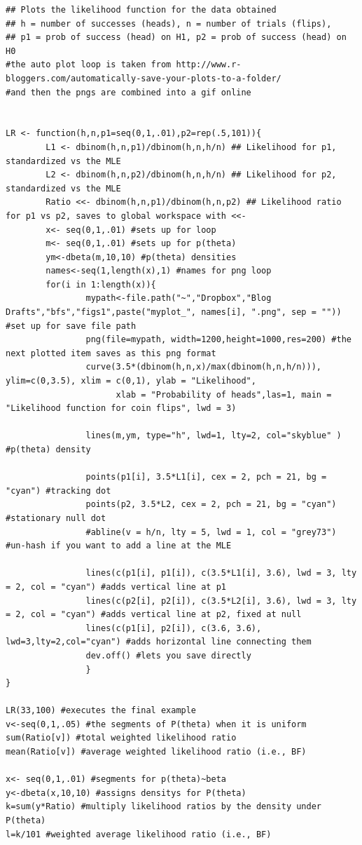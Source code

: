 \begin{lstlisting}
## Plots the likelihood function for the data obtained
## h = number of successes (heads), n = number of trials (flips), 
## p1 = prob of success (head) on H1, p2 = prob of success (head) on H0
#the auto plot loop is taken from http://www.r-bloggers.com/automatically-save-your-plots-to-a-folder/
#and then the pngs are combined into a gif online 


LR <- function(h,n,p1=seq(0,1,.01),p2=rep(.5,101)){
        L1 <- dbinom(h,n,p1)/dbinom(h,n,h/n) ## Likelihood for p1, standardized vs the MLE
        L2 <- dbinom(h,n,p2)/dbinom(h,n,h/n) ## Likelihood for p2, standardized vs the MLE
        Ratio <<- dbinom(h,n,p1)/dbinom(h,n,p2) ## Likelihood ratio for p1 vs p2, saves to global workspace with <<-
        x<- seq(0,1,.01) #sets up for loop
        m<- seq(0,1,.01) #sets up for p(theta)
        ym<-dbeta(m,10,10) #p(theta) densities
        names<-seq(1,length(x),1) #names for png loop
        for(i in 1:length(x)){
                mypath<-file.path("~","Dropbox","Blog Drafts","bfs","figs1",paste("myplot_", names[i], ".png", sep = "")) #set up for save file path
                png(file=mypath, width=1200,height=1000,res=200) #the next plotted item saves as this png format
                curve(3.5*(dbinom(h,n,x)/max(dbinom(h,n,h/n))), ylim=c(0,3.5), xlim = c(0,1), ylab = "Likelihood",
                      xlab = "Probability of heads",las=1, main = "Likelihood function for coin flips", lwd = 3)
                
                lines(m,ym, type="h", lwd=1, lty=2, col="skyblue" ) #p(theta) density
                
                points(p1[i], 3.5*L1[i], cex = 2, pch = 21, bg = "cyan") #tracking dot
                points(p2, 3.5*L2, cex = 2, pch = 21, bg = "cyan") #stationary null dot
                #abline(v = h/n, lty = 5, lwd = 1, col = "grey73") #un-hash if you want to add a line at the MLE
                
                lines(c(p1[i], p1[i]), c(3.5*L1[i], 3.6), lwd = 3, lty = 2, col = "cyan") #adds vertical line at p1
                lines(c(p2[i], p2[i]), c(3.5*L2[i], 3.6), lwd = 3, lty = 2, col = "cyan") #adds vertical line at p2, fixed at null
                lines(c(p1[i], p2[i]), c(3.6, 3.6), lwd=3,lty=2,col="cyan") #adds horizontal line connecting them
                dev.off() #lets you save directly
                }
}

LR(33,100) #executes the final example
v<-seq(0,1,.05) #the segments of P(theta) when it is uniform
sum(Ratio[v]) #total weighted likelihood ratio
mean(Ratio[v]) #average weighted likelihood ratio (i.e., BF)

x<- seq(0,1,.01) #segments for p(theta)~beta
y<-dbeta(x,10,10) #assigns densitys for P(theta)
k=sum(y*Ratio) #multiply likelihood ratios by the density under P(theta)
l=k/101 #weighted average likelihood ratio (i.e., BF)
\end{lstlisting}






